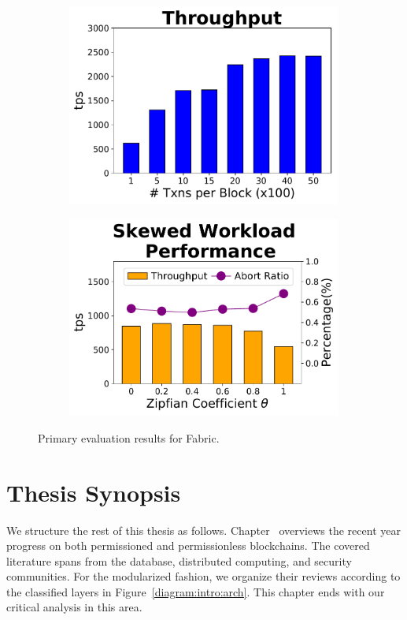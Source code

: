 \begin{figure}[tp]
	\centering
    \begin{subfigure}{0.45\textwidth}
      \includegraphics[width=0.99\textwidth]{chart/intro/noop.pdf}
    \end{subfigure}
    \begin{subfigure}{0.45\textwidth}
      \includegraphics[width=0.99\textwidth]{chart/intro/skew.pdf}
    \end{subfigure}
    \caption{Primary evaluation results for Fabric. }
    \label{chart:intro:basic}
\end{figure}

\section{Thesis Synopsis}
We structure the rest of this thesis as follows. Chapter~\cite{ch:literature} overviews the recent year progress on both permissioned and permissionless blockchains. The covered literature spans from the database, distributed computing, and security communities. For the modularized fashion, we organize their reviews according to the classified layers in Figure~\ref{diagram:intro:arch}. This chapter ends with our critical analysis in this area. 


